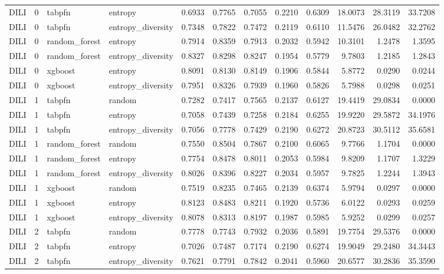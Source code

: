 \begin{tabular}{lrllrrrrrrrr}
DILI & 0 & tabpfn & entropy & 0.6933 & 0.7765 & 0.7055 & 0.2210 & 0.6309 & 18.0073 & 28.3119 & 33.7208 \\
DILI & 0 & tabpfn & entropy_diversity & 0.7348 & 0.7822 & 0.7472 & 0.2119 & 0.6110 & 11.5476 & 26.0482 & 32.2762 \\
DILI & 0 & random_forest & entropy & 0.7914 & 0.8359 & 0.7913 & 0.2032 & 0.5942 & 10.3101 & 1.2478 & 1.3595 \\
DILI & 0 & random_forest & entropy_diversity & 0.8327 & 0.8298 & 0.8247 & 0.1954 & 0.5779 & 9.7803 & 1.2185 & 1.2843 \\
DILI & 0 & xgboost & entropy & 0.8091 & 0.8130 & 0.8149 & 0.1906 & 0.5844 & 5.8772 & 0.0290 & 0.0244 \\
DILI & 0 & xgboost & entropy_diversity & 0.7951 & 0.8326 & 0.7939 & 0.1960 & 0.5826 & 5.7988 & 0.0298 & 0.0251 \\
DILI & 1 & tabpfn & random & 0.7282 & 0.7417 & 0.7565 & 0.2137 & 0.6127 & 19.4419 & 29.0834 & 0.0000 \\
DILI & 1 & tabpfn & entropy & 0.7058 & 0.7439 & 0.7258 & 0.2184 & 0.6255 & 19.9220 & 29.5872 & 34.1976 \\
DILI & 1 & tabpfn & entropy_diversity & 0.7056 & 0.7778 & 0.7429 & 0.2190 & 0.6272 & 20.8723 & 30.5112 & 35.6581 \\
DILI & 1 & random_forest & random & 0.7550 & 0.8504 & 0.7867 & 0.2100 & 0.6065 & 9.7766 & 1.1704 & 0.0000 \\
DILI & 1 & random_forest & entropy & 0.7754 & 0.8478 & 0.8011 & 0.2053 & 0.5984 & 9.8209 & 1.1707 & 1.3229 \\
DILI & 1 & random_forest & entropy_diversity & 0.8026 & 0.8396 & 0.8227 & 0.2034 & 0.5957 & 9.7825 & 1.2244 & 1.3943 \\
DILI & 1 & xgboost & random & 0.7519 & 0.8235 & 0.7465 & 0.2139 & 0.6374 & 5.9794 & 0.0297 & 0.0000 \\
DILI & 1 & xgboost & entropy & 0.8123 & 0.8483 & 0.8211 & 0.1920 & 0.5736 & 6.0122 & 0.0293 & 0.0259 \\
DILI & 1 & xgboost & entropy_diversity & 0.8078 & 0.8313 & 0.8197 & 0.1987 & 0.5985 & 5.9252 & 0.0299 & 0.0257 \\
DILI & 2 & tabpfn & random & 0.7778 & 0.7743 & 0.7932 & 0.2036 & 0.5891 & 19.7754 & 29.5376 & 0.0000 \\
DILI & 2 & tabpfn & entropy & 0.7026 & 0.7487 & 0.7174 & 0.2190 & 0.6274 & 19.9049 & 29.2480 & 34.3443 \\
DILI & 2 & tabpfn & entropy_diversity & 0.7621 & 0.7791 & 0.7842 & 0.2041 & 0.5960 & 20.6577 & 30.2836 & 35.3590 \\

\end{tabular}
